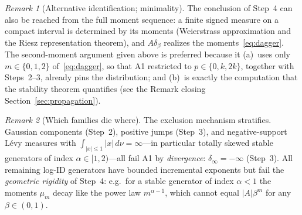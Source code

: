 \documentclass[12pt]{amsart}
\theoremstyle{definition}
\theoremstyle{remark}
\newtheorem*{remark}{Remark}
\begin{document}
\begin{remark}[Alternative identification; minimality]
The conclusion of Step~4 can also be reached from the full moment
sequence: a finite signed measure on a compact interval is determined
by its moments (Weierstrass approximation and the Riesz
representation theorem), and $A\delta_\beta$ realizes the
moments~\eqref{eq:dagger}.  The second-moment argument given above is
preferred because it (a)~uses only $m \in \{0,1,2\}$
of~\eqref{eq:dagger}, so that A1 restricted to $p \in \{0, k, 2k\}$,
together with Steps~2--3\textonehalf, already pins the distribution;
and (b)~is exactly the computation that the stability theorem
quantifies (see the Remark closing
Section~\ref{sec:propagation}).
\end{remark}

\begin{remark}[Which families die where]
The exclusion mechanism stratifies.  Gaussian components (Step~2),
positive jumps (Step~3), and negative-support L\'evy measures with
$\int_{|x|\le1}|x|\,d\nu = \infty$---in particular totally skewed
stable generators of index $\alpha \in [1,2)$---all fail A1 by
\emph{divergence}: $\delta_\infty = -\infty$
(Step~3\textonehalf).  All remaining log-ID generators have bounded
incremental exponents but fail the \emph{geometric rigidity} of
Step~4: e.g.\ for a stable generator of index $\alpha < 1$ the
moments $\mu_m$ decay like the power law $m^{\alpha-1}$, which cannot
equal $|A|\beta^m$ for any $\beta \in (0,1)$.
\end{remark}
\end{document}
